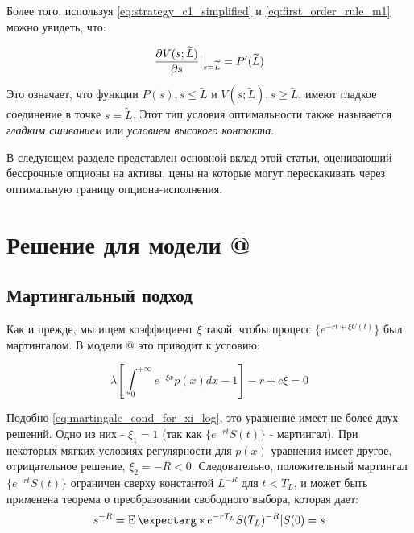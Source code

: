 \documentclass[a4paper,12pt]{article}
\makeatletter
\theoremstyle{definition}
\newcommand*{\rom}[1]{\expandafter\@slowromancap\romannumeral #1@}
\newcommand{\at}[2][]{#1|_{#2}}
\newcommand{\expect}{\operatorname{E}\expectarg}
\makeatother
\begin{document}
Более того, используя \eqref{eq:strategy_c1_simplified} и \eqref{eq:first_order_rule_m1} можно увидеть, что:

\begin{equation}\label{eq:smooth_pasting_condition_m1}
    \pdv{V(s; \widetilde{L})}{s}\at[\big]{s=\widetilde{L}} = P'(\widetilde{L})
\end{equation}

Это означает, что функции $P(s), s \le \widetilde{L}$ и $V(s; \widetilde{L}), s \ge \widetilde{L}$, имеют гладкое соединение в точке $s = \widetilde{L}$. Этот тип условия оптимальности также называется \textit{гладким сшиванием} или \textit{условием высокого контакта}.

В следующем разделе представлен основной вклад этой статьи, оценивающий бессрочные опционы на активы, цены на которые могут перескакивать через оптимальную границу опциона-исполнения.

\section{Решение для модели \rom{2}}

\subsection{Мартингальный подход}

Как и прежде, мы ищем коэффициент $\xi$ такой, чтобы
процесс $\{e^{-rt + \xi U(t)}\}$ был мартингалом. В модели \rom{2} это
приводит к условию:

\begin{equation}
    \lambda \left[ \int_{0}^{+\infty} e^{-\xi x} p(x) dx - 1 \right] - r + c \xi = 0
\end{equation}

Подобно \eqref{eq:martingale_cond_for_xi_log}, это уравнение имеет не более двух решений. Одно из них - $\xi_1 = 1$ (так как $\{e^{-rt} S(t)\}$ - мартингал).
При некоторых мягких условиях регулярности для $p(x)$ уравнения имеет другое, отрицательное решение, $\xi_2 = -R < 0$. Следовательно, положительный мартингал  $\{e^{-rt} S(t)\}$ ограничен сверху константой $L^{-R}$ для $t < T_L$, и может быть применена теорема о преобразовании свободного выбора, которая дает:
\begin{equation*}
    s^{-R} = \expect*{e^{-rT_L} S(T_L)^{-R} | S(0) = s}
\end{equation*}
\end{document}
